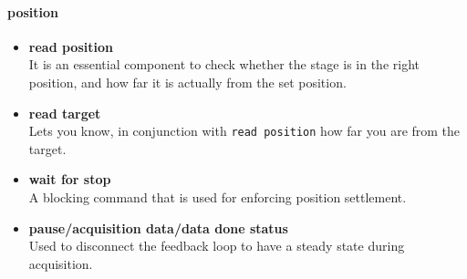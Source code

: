 \documentclass[10pt,letter,twoside]{report}
\begin{document}
		
			\paragraph{position}
			\begin{itemize}
			\item \textbf{read position}\\
			It is an essential component to check whether the stage is in the right position, and how far it is actually from the set position.
			\item \textbf{read target}\\
			Lets you know, in conjunction with \verb!read position! how far you are from the target.
			\item \textbf{wait for stop}\\
			A blocking command that is used for enforcing position settlement.
			\item \textbf{pause/acquisition data/data done status}\\
			Used to disconnect the feedback loop to have a steady state during acquisition.
			\end{itemize}			
		
\end{document}
